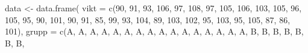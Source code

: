 \documentclass[
  letterpaper,
  DIV=11,
  numbers=noendperiod]{scrartcl}
\newenvironment{Shaded}{\begin{snugshade}}{\end{snugshade}}
\newcommand{\AttributeTok}[1]{\textcolor[rgb]{0.40,0.45,0.13}{#1}}
\newcommand{\DecValTok}[1]{\textcolor[rgb]{0.68,0.00,0.00}{#1}}
\newcommand{\FunctionTok}[1]{\textcolor[rgb]{0.28,0.35,0.67}{#1}}
\newcommand{\NormalTok}[1]{\textcolor[rgb]{0.00,0.23,0.31}{#1}}
\newcommand{\OtherTok}[1]{\textcolor[rgb]{0.00,0.23,0.31}{#1}}
\newcommand{\StringTok}[1]{\textcolor[rgb]{0.13,0.47,0.30}{#1}}
\begin{document}
\begin{Shaded}
\begin{Highlighting}[]
\NormalTok{data }\OtherTok{\textless{}{-}} \FunctionTok{data.frame}\NormalTok{(}
  \AttributeTok{vikt =} \FunctionTok{c}\NormalTok{(}\DecValTok{90}\NormalTok{, }\DecValTok{91}\NormalTok{, }\DecValTok{93}\NormalTok{, }\DecValTok{106}\NormalTok{, }\DecValTok{97}\NormalTok{, }\DecValTok{108}\NormalTok{, }\DecValTok{97}\NormalTok{, }\DecValTok{105}\NormalTok{,}
  \DecValTok{106}\NormalTok{, }\DecValTok{103}\NormalTok{, }\DecValTok{105}\NormalTok{, }\DecValTok{96}\NormalTok{, }\DecValTok{105}\NormalTok{, }\DecValTok{95}\NormalTok{, }\DecValTok{90}\NormalTok{, }\DecValTok{101}\NormalTok{,}
           \DecValTok{90}\NormalTok{, }\DecValTok{91}\NormalTok{, }\DecValTok{85}\NormalTok{, }\DecValTok{99}\NormalTok{, }\DecValTok{93}\NormalTok{, }\DecValTok{104}\NormalTok{, }\DecValTok{89}\NormalTok{, }\DecValTok{103}\NormalTok{,}
           \DecValTok{102}\NormalTok{, }\DecValTok{95}\NormalTok{, }\DecValTok{103}\NormalTok{, }\DecValTok{95}\NormalTok{, }\DecValTok{105}\NormalTok{, }\DecValTok{87}\NormalTok{, }\DecValTok{86}\NormalTok{, }\DecValTok{101}\NormalTok{),}
  \AttributeTok{grupp =} \FunctionTok{c}\NormalTok{(}\StringTok{\textquotesingle{}A\textquotesingle{}}\NormalTok{, }\StringTok{\textquotesingle{}A\textquotesingle{}}\NormalTok{, }\StringTok{\textquotesingle{}A\textquotesingle{}}\NormalTok{, }\StringTok{\textquotesingle{}A\textquotesingle{}}\NormalTok{, }\StringTok{\textquotesingle{}A\textquotesingle{}}\NormalTok{, }\StringTok{\textquotesingle{}A\textquotesingle{}}\NormalTok{, }\StringTok{\textquotesingle{}A\textquotesingle{}}\NormalTok{,}
  \StringTok{\textquotesingle{}A\textquotesingle{}}\NormalTok{, }\StringTok{\textquotesingle{}A\textquotesingle{}}\NormalTok{, }\StringTok{\textquotesingle{}A\textquotesingle{}}\NormalTok{, }\StringTok{\textquotesingle{}A\textquotesingle{}}\NormalTok{, }\StringTok{\textquotesingle{}A\textquotesingle{}}\NormalTok{, }\StringTok{\textquotesingle{}A\textquotesingle{}}\NormalTok{, }\StringTok{\textquotesingle{}A\textquotesingle{}}\NormalTok{, }\StringTok{\textquotesingle{}A\textquotesingle{}}\NormalTok{, }\StringTok{\textquotesingle{}A\textquotesingle{}}\NormalTok{,}
            \StringTok{\textquotesingle{}B\textquotesingle{}}\NormalTok{, }\StringTok{\textquotesingle{}B\textquotesingle{}}\NormalTok{, }\StringTok{\textquotesingle{}B\textquotesingle{}}\NormalTok{, }\StringTok{\textquotesingle{}B\textquotesingle{}}\NormalTok{, }\StringTok{\textquotesingle{}B\textquotesingle{}}\NormalTok{, }\StringTok{\textquotesingle{}B\textquotesingle{}}\NormalTok{, }\StringTok{\textquotesingle{}B\textquotesingle{}}\NormalTok{,}

\end{Highlighting}
\end{Shaded}
\end{document}
